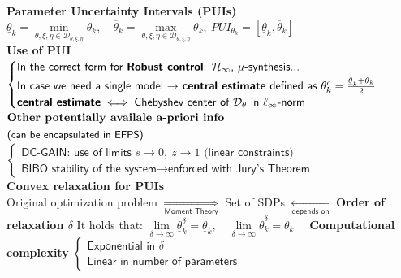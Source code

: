 \documentclass[a4paper, 12pt]{article}
\begin{document}
\noindent
\textbf{Parameter Uncertainty Intervals (PUIs)}
$\underline{\theta}_k=\underset{\theta,\xi,\eta\in\mathcal{D_{\theta,\xi,\eta}}}{\min}
 {\theta_k}, \quad \overline{\theta}_k=\underset{\theta,\xi,\eta\in\mathcal{D_{\theta,\xi,\eta}}} {\max}{\theta_k} \label{eq:PUIs}, \ PUI_{\theta_k} =  [\underline{\theta}_k, \overline{\theta}_k]$\\

\noindent
\textbf{Use of PUI} $
\begin{cases}
    \textsf{In the correct form for \textbf{Robust control}: $\mathcal{H}_\infty$, $\mu$-synthesis...}\\
    \textsf{In case we need a single model $\to$ \textbf{central estimate} defined as }
    \theta_k^c = \frac{\underline{\theta}_k+\overline{\theta}_k}{2}\\
    \textsf{\textbf{central estimate}} \iff 
    \textsf{Chebyshev center of $\mathcal{D}_\theta$ in $\ell_\infty$-norm} 
\end{cases}$\\
$\begin{aligned}
    \centering
    &\textbf{Other potentially availale a-priori info}\\
    &{\small{\textsf{(can be encapsulated in EFPS)}}}
\end{aligned}$
$\begin{cases}
    \textsf{DC-GAIN: use of limits } s\to0, \ z\to 1 \textsf{ (linear constraints)}\\
    \textsf{BIBO stability of the system} \to \textsf{enforced with Jury's Theorem}
\end{cases}$\\

\noindent
\textbf{Convex relaxation for PUIs }\\
Original optimization problem $\underset{\textsf{Moment Theory}}{\Longrightarrow}$ Set of SDPs $\underset{\textsf{depends on}}{\leftarrow}$ \textbf{Order of relaxation $\delta$}
\noindent
It holds that:
$\underset{\delta\to\infty}{\lim}  \underline{\theta}_k^\delta = \underline{\theta}_k, \quad
\underset{\delta\to\infty}{\lim} \overline{\theta}_k^\delta = \overline{\theta}_k \quad$ 
\textbf{Computational complexity} $\begin{cases}
    \textsf{Exponential in } \delta\\
    \textsf{Linear in number of parameters}
\end{cases}$\\
\end{document}
